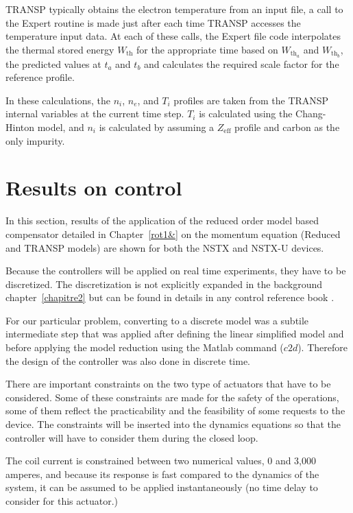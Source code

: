 \documentclass[12pt,lot, lof]{puthesis}
\begin{document}
TRANSP typically obtains the electron temperature from an input file, a call to the Expert routine is made just after each time TRANSP accesses the temperature input data. At each of these calls, the Expert file code interpolates the thermal stored energy $W_\text{th}$ for the appropriate time based on $W_{\text{th}_a}$ and $W_{\text{th}_b}$, the predicted values at $t_a$ and $t_b$ and calculates the required scale factor for the reference profile.

In these calculations, the $n_i$, $n_e$, and $T_i$ profiles are taken from the TRANSP internal variables at the current time step. $T_i$ is calculated using the Chang-Hinton model, and $n_i$ is calculated by assuming a $Z_\text{eff}$ profile and carbon as the only impurity.

\section{Results on control}

In this section, results of the application of the reduced order model based compensator detailed in Chapter~\ref{rot1&} on the momentum equation (Reduced and TRANSP models) are shown for both the NSTX and NSTX-U devices.

Because the controllers will be applied on real time experiments, they have to be discretized. The discretization is not explicitly expanded in the background chapter~\ref{chapitre2} but can be found in details in any control reference book \cite{AandM, SandP}.

For our particular problem, converting to a discrete model was a subtile intermediate step that was applied after defining the linear simplified model and before applying the model reduction using the Matlab command ($c2d$). Therefore the design of the controller was also done in discrete time.

There are important constraints on the two type of actuators that have to be considered. Some of these constraints are made for the safety of the operations, some of them reflect the practicability and the feasibility of some requests to the device. The constraints will be inserted into the dynamics equations so that the controller will have to consider them during the closed loop.

The coil current is constrained between two numerical values, 0 and 3,000 amperes, and because its response is fast compared to the dynamics of the system, it can be assumed to be applied instantaneously (no time delay to consider for this actuator.)
\end{document}
